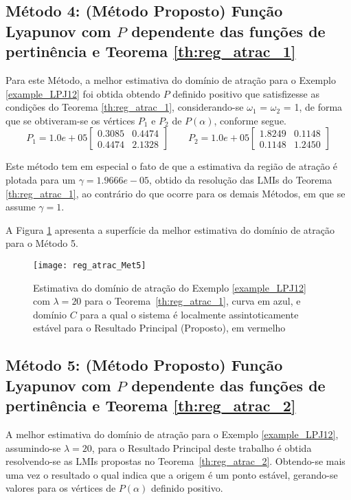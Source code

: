 \subsection{Método 4: (Método Proposto) Função Lyapunov com $P$ dependente das funções de pertinência e Teorema \ref{th:reg_atrac_1}}

Para este Método, a melhor estimativa do domínio de atração para o Exemplo \ref{example_LPJ12} foi obtida obtendo $P$ definido positivo que satisfizesse as condições do Teorema \ref{th:reg_atrac_1}, considerando-se $\omega_1$ = $\omega_2$ = 1, de forma que se obtiveram-se os vértices $P_1$ e $P_2$ de $P(\alpha)$, conforme segue.
\begin{equation*}
P_1 = 1.0e+05 \begin{bmatrix} 0.3085&0.4474\\0.4474&2.1328\end{bmatrix}\qquad P_2 = 1.0e+05 \begin{bmatrix}1.8249& 0.1148\\ 0.1148&1.2450\end{bmatrix}
\end{equation*}

Este método tem em especial o fato de que a estimativa da região de atração é plotada para um $\gamma = 1.9666e-05$, obtido da resolução das LMIs do Teorema \ref{th:reg_atrac_1}, ao contrário do que ocorre para os demais Métodos, em que se assume $\gamma = 1$.

A Figura \ref{fig:reg_atrac_met5} apresenta a superfície da melhor estimativa do domínio de atração para o Método 5.

\begin{figure}[htbp]
	\centering
	\texttt{[image: reg\_atrac\_Met5]}
	\caption{Estimativa do domínio de atração do Exemplo \ref{example_LPJ12} com $\lambda = 20$ para o Teorema~\ref{th:reg_atrac_1}, curva em azul, e domínio $C$ para a qual o sistema é localmente assintoticamente estável para o Resultado Principal (Proposto), em vermelho}
	\label{fig:reg_atrac_met5}
\end{figure}

\subsection{Método 5: (Método Proposto) Função Lyapunov com $P$ dependente das funções de pertinência e Teorema \ref{th:reg_atrac_2}}

A melhor estimativa do domínio de atração para o Exemplo \ref{example_LPJ12}, assumindo-se $\lambda = 20$, para o Resultado Principal deste trabalho é obtida resolvendo-se as LMIs propostas no Teorema~\ref{th:reg_atrac_2}. Obtendo-se mais uma vez o resultado o qual indica que a origem é um ponto estável, gerando-se valores para os vértices de $P(\alpha)$ definido positivo.

